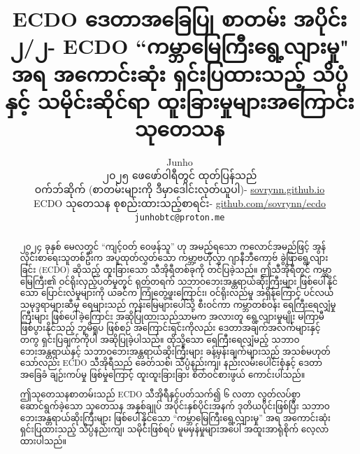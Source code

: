\documentclass[10pt,twocolumn,letterpaper]{article}
\begin{document}
\title{ECDO ဒေတာအခြေပြု စာတမ်း အပိုင်း ၂/၂- ECDO “ကမ္ဘာမြေကြီးရွေ့လျားမှု" အရ အကောင်းဆုံး ရှင်းပြထားသည့် သိပ္ပံနှင့် သမိုင်းဆိုင်ရာ ထူးခြားမှုများအကြောင်း သုတေသန}

\author{Junho\\
၂၀၂၅ ဖေဖော်ဝါရီတွင် ထုတ်ပြန်သည်\\
ဝက်ဘ်ဆိုက် (စာတမ်းများကို ဒီမှာဒေါင်းလုတ်ယူပါ)- \href{https://sovrynn.github.io}{sovrynn.github.io}\\
ECDO သုတေသန စုစည်းထားသည့်စာရင်း- \href{https://github.com/sovrynn/ecdo}{github.com/sovrynn/ecdo}\\
{\tt\small junhobtc@proton.me}
}

\maketitle

\begin{abstract}
၂၀၂၄ ခုနှစ် မေလတွင် “ကျင့်ဝတ် ဝေဖန်သူ” \cite{0} ဟု အမည်ရသော ကလောင်အမည်ဖြင့် အွန်လိုင်းစာရေးသူတစ်ဦးက အပူထုတ်လွှတ်သော ကမ္ဘာ့ဗဟိုလွှာ ဂျာနီဘီကော့ဗ် ခွဲဖြာရွေ့လျားခြင်း (ECDO) \cite{1} ဆိုသည့် ထူးခြားသော သီအိုရီတစ်ခုကို တင်ပြခဲ့သည်။ ဤသီအိုရီတွင် ကမ္ဘာမြေကြီး၏ ဝင်ရိုးလှည့်ပတ်မှုတွင် ရုတ်တရက် သဘာဝဘေးအန္တရာယ်ဆိုးကြီးများ ဖြစ်ပေါ်နိုင်သော ပြောင်းလဲမှုများကို ယခင်က ကြုံတွေ့ဖူးကြောင်း၊ ဝင်ရိုးလည်မှု အရှိန်ကြောင့် ပင်လယ်သမုဒ္ဒရာများဆီမှ ရေများသည် ကုန်းမြေများပေါ်သို့ စီးဝင်ကာ ကမ္ဘာတစ်ဝန်း ရေကြီးရေလျှံမှုကြီးများ ဖြစ်ပေါ်ခဲ့ကြောင်း အဆိုပြုထားသည်သာမက အလားတူ ရွေ့လျားမှုမျိုး မကြာမီဖြစ်ပွားနိုင်သည့် ဘူမိရူပ ဖြစ်စဉ် အကြောင်းရင်းကိုလည်း ဒေတာအချက်အလက်များနှင့်တကွ ရှင်းပြချက်ကိုပါ အဆိုပြုခဲ့ပါသည်။ ထိုသို့သော ရေကြီးရေလျှံမည့် သဘာဝဘေးအန္တရာယ်နှင့် သဘာဝဘေးအန္တရာယ်ဆိုးကြီးများ ခန့်မှန်းချက်များသည် အသစ်မဟုတ်သော်လည်း ECDO သီအိုရီသည် ခေတ်သစ်၊ သိပ္ပံနည်းကျ၊ နည်းလမ်းပေါင်းစုံနှင့် ဒေတာအခြေခံ ချဉ်းကပ်မှု ဖြစ်မှုကြောင့် ထူးထူးခြားခြား စိတ်ဝင်စားဖွယ် ကောင်းပါသည်။

ဤသုတေသနစာတမ်းသည် ECDO သီအိုရီနှင့်ပတ်သက်၍ ၆ လတာ လွတ်လပ်စွာ ဆောင်ရွက်ခဲ့သော သုတေသန အနှစ်ချုပ် \cite{2,20} အပိုင်းနှစ်ပိုင်းအနက် ဒုတိယပိုင်းဖြစ်ပြီး သဘာဝဘေးအန္တရာယ်ဆိုးကြီးများ ဖြစ်ပေါ်နိုင်သော “ကမ္ဘာမြေကြီးရွေ့လျားမှု” အရ အကောင်းဆုံး ရှင်းပြထားသည့် သိပ္ပံနည်းကျ၊ သမိုင်းဖြစ်ရပ် မူမမှန်မှုများအပေါ် အထူးအာရုံစိုက် လေ့လာထားပါသည်။

\end{abstract}
\end{document}
